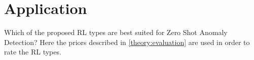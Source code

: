 \chapter{Application}\label{application}
 Which of the proposed RL types are best suited for Zero Shot Anomaly Detection?
Here the priors described in \ref{theory:evaluation} are used in order to rate the RL types.
